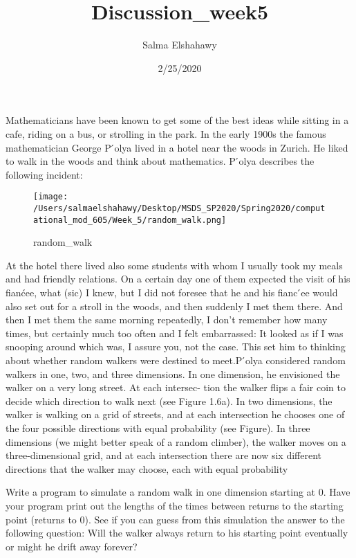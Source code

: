 \documentclass[]{article}
\title{Discussion\_week5}
\author{Salma Elshahawy}
\date{2/25/2020}
\begin{document}
\maketitle

Mathematicians have been known to get some of the best ideas while
sitting in a cafe, riding on a bus, or strolling in the park. In the
early 1900s the famous mathematician George P ́olya lived in a hotel near
the woods in Zurich. He liked to walk in the woods and think about
mathematics. P ́olya describes the following incident:

\begin{figure}
\centering
\texttt{[image: /Users/salmaelshahawy/Desktop/MSDS\_SP2020/Spring2020/computational\_mod\_605/Week\_5/random\_walk.png]}
\caption{random\_walk}
\end{figure}

At the hotel there lived also some students with whom I usually took my
meals and had friendly relations. On a certain day one of them expected
the visit of his fianćee, what (sic) I knew, but I did not foresee that
he and his fianc ́ee would also set out for a stroll in the woods, and
then suddenly I met them there. And then I met them the same morning
repeatedly, I don't remember how many times, but certainly much too
often and I felt embarrassed: It looked as if I was snooping around
which was, I assure you, not the case. This set him to thinking about
whether random walkers were destined to meet.P ́olya considered random
walkers in one, two, and three dimensions. In one dimension, he
envisioned the walker on a very long street. At each intersec- tion the
walker flips a fair coin to decide which direction to walk next (see
Figure 1.6a). In two dimensions, the walker is walking on a grid of
streets, and at each intersection he chooses one of the four possible
directions with equal probability (see Figure). In three dimensions (we
might better speak of a random climber), the walker moves on a
three-dimensional grid, and at each intersection there are now six
different directions that the walker may choose, each with equal
probability

Write a program to simulate a random walk in one dimension starting at
0. Have your program print out the lengths of the times between returns
to the starting point (returns to 0). See if you can guess from this
simulation the answer to the following question: Will the walker always
return to his starting point eventually or might he drift away forever?
\end{document}
